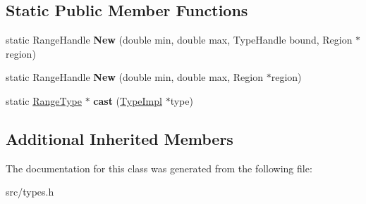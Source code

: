 \subsection*{Static Public Member Functions}
\begin{DoxyCompactItemize}
\item 
\hypertarget{classv8_1_1internal_1_1_type_impl_1_1_range_type_a1437a7f406ee7195b557bd82d0130497}{}static Range\+Handle {\bfseries New} (double min, double max, Type\+Handle bound, Region $\ast$region)\label{classv8_1_1internal_1_1_type_impl_1_1_range_type_a1437a7f406ee7195b557bd82d0130497}

\item 
\hypertarget{classv8_1_1internal_1_1_type_impl_1_1_range_type_a9576a343168fc134beeb0681080918c6}{}static Range\+Handle {\bfseries New} (double min, double max, Region $\ast$region)\label{classv8_1_1internal_1_1_type_impl_1_1_range_type_a9576a343168fc134beeb0681080918c6}

\item 
\hypertarget{classv8_1_1internal_1_1_type_impl_1_1_range_type_ae124944b15c3452057f6ed58411583b5}{}static \hyperlink{classv8_1_1internal_1_1_type_impl_1_1_range_type}{Range\+Type} $\ast$ {\bfseries cast} (\hyperlink{classv8_1_1internal_1_1_type_impl}{Type\+Impl} $\ast$type)\label{classv8_1_1internal_1_1_type_impl_1_1_range_type_ae124944b15c3452057f6ed58411583b5}

\end{DoxyCompactItemize}
\subsection*{Additional Inherited Members}


The documentation for this class was generated from the following file\+:\begin{DoxyCompactItemize}
\item 
src/types.\+h\end{DoxyCompactItemize}
